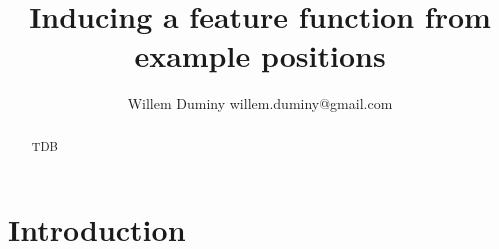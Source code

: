 \documentclass[twoside,11pt]{article}
\begin{document}
\title{Inducing a feature function from example positions}

\author{\name Willem Duminy \email willem.duminy@gmail.com }


\maketitle


\begin{abstract}
TDB
\end{abstract}

\section{Introduction}



\vskip 0.2in


\end{document}
